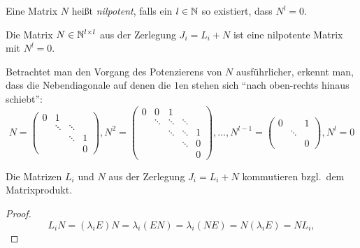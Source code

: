 \begin{definition}[Wiederholung]
    Eine Matrix $N$ heißt \emph{nilpotent}, falls ein $l \in \mathbb{N}$ so existiert, dass $N^l = 0$.
\end{definition}

\begin{corollary}
    Die Matrix $N \in \mathbb{N}^{l \times l}$ aus der Zerlegung $J_i = L_i + N$ ist eine nilpotente Matrix mit $N^l = 0$.
\end{corollary}

Betrachtet man den Vorgang des Potenzierens von $N$ ausführlicher, erkennt man,
dass die Nebendiagonale auf denen die $1$en stehen sich \enquote{nach oben-rechts hinaus schiebt}:
\begin{equation*}
    N = \begin{pmatrix}
             0 & 1      &        & \\
               & \ddots & \ddots & \\
               &        & \ddots & 1\\
               &        &        & 0
         \end{pmatrix},
    N^2 = \begin{pmatrix}
               0 & 0      & 1      &        & \\
                 & \ddots & \ddots & \ddots & \\
                 &        & \ddots & \ddots & 1\\
                 &        &        & \ddots & 0\\
                 &        &        &        & 0
           \end{pmatrix},
    \dots,
    N^{l-1} = \begin{pmatrix}
                   0 &        & 1\\
                     & \ddots & \\
                     &        & 0
              \end{pmatrix},
    N^l = \mathfrak{0}
\end{equation*}

\begin{lemma}
    Die Matrizen $L_i$ und $N$ aus der Zerlegung $J_i = L_i + N$ kommutieren bzgl.\ dem Matrixprodukt.
\end{lemma}

\begin{proof}
    \begin{equation*}
        L_i N = (\lambda_i E) N = \lambda_i (EN) = \lambda_i (NE) = N (\lambda_i E) = N L_i,
    \end{equation*}
\end{proof}

